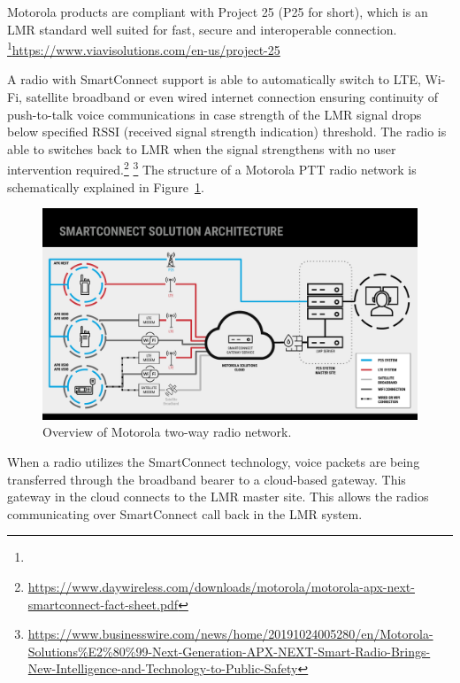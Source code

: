 Motorola products are compliant with Project 25 (P25 for short), which is an LMR standard well suited for fast, secure and interoperable connection. \footnote{}{\url{https://www.viavisolutions.com/en-us/project-25}}

A radio with SmartConnect support is able to automatically switch to LTE, Wi-Fi, satellite broadband or even wired internet connection ensuring continuity of push-to-talk voice communications in case strength of the LMR signal drops below specified RSSI (received signal strength indication) threshold. 
The radio is able to switches back to LMR when the signal strengthens with no user intervention required.\footnote{\url{https://www.daywireless.com/downloads/motorola/motorola-apx-next-smartconnect-fact-sheet.pdf}}
\footnote{\url{https://www.businesswire.com/news/home/20191024005280/en/Motorola-Solutions\%E2\%80\%99-Next-Generation-APX-NEXT-Smart-Radio-Brings-New-Intelligence-and-Technology-to-Public-Safety}}
The structure of a Motorola PTT radio network is schematically explained in Figure~\ref{smart-connect:smart-connect-architecture}.

\begin{figure}[h]
    \centering
    \includegraphics[width=\textwidth]{img/motorola-smart-connect-architecture.pdf}
    \caption{Overview of Motorola two-way radio network.}
    \label{smart-connect:smart-connect-architecture}
\end{figure}

When a radio utilizes the SmartConnect technology, voice packets are being transferred through the broadband bearer to a cloud-based gateway. This gateway in the cloud connects to the LMR master site. This allows the radios communicating over SmartConnect call back in the LMR system. 

